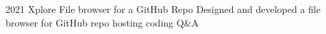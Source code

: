 
\revent
	{2021}
	{Xplore}
	{File browser for a GitHub Repo}
	{Designed and developed a file browser for GitHub repo hosting coding Q\&A
	}
	{}
	{}